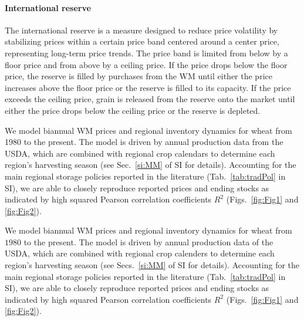 \documentclass[12pt]{article}
\begin{document}
\paragraph*{International reserve}
\label{sec:int_reserve}
The international reserve is a measure designed to reduce price volatility by stabilizing prices within a certain price band centered around a center price, representing long-term price trends. The price band is limited from below by a floor price and from above by a ceiling price. If the price drops below the floor price, the reserve is filled by purchases from the WM until either the price increases above the floor price or the reserve is filled to its capacity. If the price exceeds the ceiling price, grain is released from the reserve onto the market until either the price drops below the ceiling price or the reserve is depleted.

We model biannual WM prices and regional inventory dynamics for wheat from 1980 to the present. The model is driven by annual production data from the USDA, which are combined with regional crop calendars to determine each region's harvesting season (see Sec.~\ref{si:MM} of SI for details). Accounting for the main regional storage policies reported in the literature (Tab.~\ref{tab:tradPol} in SI), we are able to closely reproduce reported prices and ending stocks as indicated by high squared Pearson correlation coefficients $R^2$ (Figs.~\ref{fig:Fig1} and \ref{fig:Fig2}).

We model biannual WM prices and regional inventory dynamics for wheat from $1980$ to the
present. The model is driven by annual production data of the USDA, which are combined with regional
crop calenders to determine each region's harvesting season (see Secs.~\ref{si:MM} of SI for details). Accounting for the main regional storage policies reported in
the literature (Tab.~\ref{tab:tradPol} in SI), we are able to closely reproduce reported prices and
ending stocks as indicated by high squared Pearson correlation coefficients $R^2$
(Figs.~\ref{fig:Fig1} and \ref{fig:Fig2}).
\end{document}
